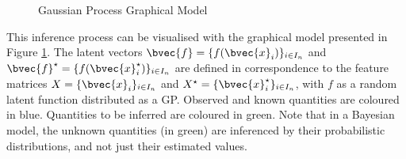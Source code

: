 				\begin{figure}[!ht]
				\centering{}		
				\caption{Gaussian Process Graphical Model}
				\label{Figure:GaussianProcessGraphicalModel}
				\end{figure}
				
				This inference process can be visualised with the graphical model presented in Figure \ref{Figure:GaussianProcessGraphicalModel}. The latent vectors $\bvec{f} = \{f(\bvec{x}_{i})\}_{i \in I_{n}}$ and $\bvec{f}^{\star} = \{f(\bvec{x}^{\star}_{i})\}_{i \in I_{n}}$ are defined in correspondence to the feature matrices $X = \{\bvec{x}_{i}\}_{i \in I_{n}}$ and $X^{\star} = \{\bvec{x}^{\star}_{i}\}_{i \in I_{n}}$, with $f$ as a random latent function distributed as a GP. Observed and known quantities are coloured in blue. Quantities to be inferred are coloured in green. Note that in a Bayesian model, the unknown quantities (in green) are inferenced by their probabilistic distributions, and not just their estimated values. 
				
				
